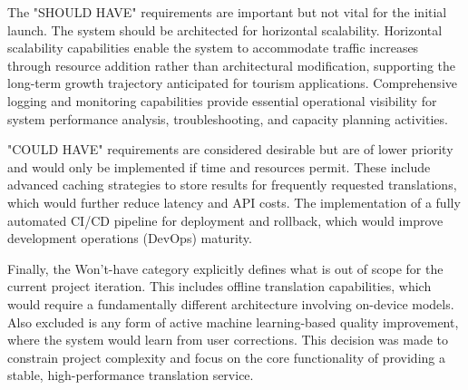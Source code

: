 The "SHOULD HAVE" requirements are important but not vital for the initial launch. The system should be architected for horizontal scalability. Horizontal scalability capabilities enable the system to accommodate traffic increases through resource addition rather than architectural modification, supporting the long-term growth trajectory anticipated for tourism applications\cite{cloudzero_horizontal_scaling,sentinelone_horizontal_scalability}. Comprehensive logging and monitoring capabilities provide essential operational visibility for system performance analysis, troubleshooting, and capacity planning activities\cite{bryant2020observability,sematext_logging_best_practices}. 

"COULD HAVE" requirements are considered desirable but are of lower priority and would only be implemented if time and resources permit. These include advanced caching strategies to store results for frequently requested translations, which would further reduce latency and API costs\cite{microsoft2022caching,tekula2024amazon,apyflux2024optimising}. The implementation of a fully automated CI/CD pipeline for deployment and rollback, which would improve development operations (DevOps) maturity\cite{zymr_devops_maturity,redhat2024cicd,testevolve2025cicd}.

Finally, the Won't-have category explicitly defines what is out of scope for the current project iteration. This includes offline translation capabilities, which would require a fundamentally different architecture involving on-device models. Also excluded is any form of active machine learning-based quality improvement, where the system would learn from user corrections. This decision was made to constrain project complexity and focus on the core functionality of providing a stable, high-performance translation service\cite{on_device_language_models,real_time_vs_offline_translation,postediting}.

